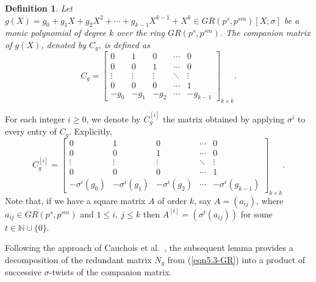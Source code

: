\documentclass[11pt]{article}
\newtheorem{definition}{Definition}
\begin{document}
\begin{definition}
Let 
\(
g(X) = g_0 + g_1 X + g_2 X^2 + \cdots + g_{k-1} X^{k-1} + X^k \in GR(p^s,p^{sm})[X;\sigma]
\)
be a monic polynomial of degree \(k\) over the ring \(GR(p^s,p^{sm})\).
The companion matrix of \(g(X)\), denoted by \(C_g\), is defined as
\[
C_g =
\begin{bmatrix}
0 & 1 & 0 & \cdots  & 0 \\
0 & 0 & 1 & \cdots  & 0 \\
\vdots & \vdots & \vdots & \ddots & \vdots \\
0 & 0 & 0 & \cdots  & 1 \\
-g_0 & -g_1 & -g_2 & \cdots  &- g_{k-1}
\end{bmatrix}_{k \times k}.
\]
\end{definition}

For each integer \(i \geq 0\), we denote by \(C_g^{[i]}\) the matrix obtained by 
applying \(\sigma^i\) to every entry of \(C_g\). Explicitly,
\[
C_g^{[i]} =
\begin{bmatrix}
0 & 1 & 0 & \cdots  & 0 \\
0 & 0 & 1 & \cdots & 0 \\
\vdots & \vdots & \vdots & \ddots &  \vdots \\
0 & 0 & 0 & \cdots &  1 \\
-\sigma^i(g_0) &- \sigma^i(g_1) &- \sigma^i(g_2) & \cdots &- \sigma^i(g_{k-1})
\end{bmatrix}_{k \times k}.
\]
Note that, if we have a square matrix $A$ of order $k$, say $A=(a_{ij})$, where $a_{ij}\in GR(p^s,p^{sm})$ and $1\leq i,~j \leq k$ then $A^{[t]}=(\sigma^t(a_{ij}))$ for some $t\in \mathbb{N}\cup \{0\}.$


Following the approach of Cauchois et al.~\cite[Theorem 2]{Cauchois2016direct}, the subsequent lemma provides a decomposition of the redundant matrix $N_g$ from (\ref{eqn5.3-GR}) into a product of successive \(\sigma\)-twists of the companion matrix.
\end{document}
